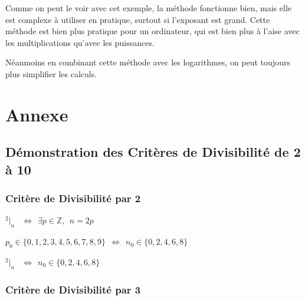 \documentclass[a4paper]{article}
\begin{document}
\vspace{3 mm}

Comme on peut le voir avec cet exemple, la méthode fonctionne bien, mais elle est complexe à utiliser en pratique, surtout si l'exposant est grand. 
Cette méthode est bien plus pratique pour un ordinateur, qui est bien plus à l'aise avec les multiplications qu'avec les puissances.

Néanmoins en combinant cette méthode avec les logarithmes, on peut toujours plus simplifier les calculs.

\vfill
\vfill
\vfill

\pagebreak





\section{Annexe}
\subsection{Démonstration des Critères de Divisibilité de 2 à 10} \label{demo_1_a_10}

\large

\subsubsection*{Critère de Divisibilité par 2}

\begin{center}
	{\LARGE $^2|_n$} $ ~~ \Longleftrightarrow ~~ \exists p \in \mathbb{Z}, ~~ n = 2p $\\
	
	\vspace{2mm}
	
	{\normalsize $ p_0 \in \{0,1,2,3,4,5,6,7,8,9\} ~~ \Longleftrightarrow ~~ n_0 \in \{ 0,2,4,6,8 \}$}\\
	
	\vspace{2mm}	
	
	{\LARGE $^2|_n$} $~~ \Longleftrightarrow ~~ n_0 \in \{ 0,2,4,6,8 \}$
	
\end{center}



\subsubsection*{Critère de Divisibilité par 3}
\end{document}
